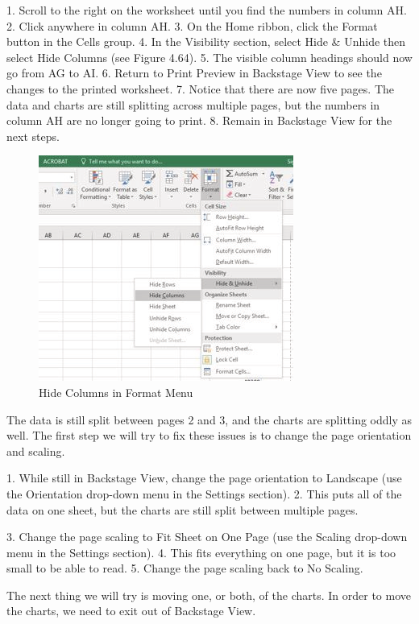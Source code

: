 1. Scroll to the right on the worksheet until you find the numbers in column AH.
2. Click anywhere in column AH.
3. On the Home ribbon, click the Format button in the Cells group.
4. In the Visibility section, select Hide \& Unhide then select Hide Columns (see Figure 4.64).
5. The visible column headings should now go from AG to AI.
6. Return to Print Preview in Backstage View to see the changes to the printed worksheet.
7. Notice that there are now five pages. The data and charts are still splitting across multiple
pages, but the numbers in column AH are no longer going to print.
8. Remain in Backstage View for the next steps.


\begin{figure}[H]
	\centering
	\includegraphics[width=\maxwidth{.95\linewidth}]{gfx/ch04_fig49}
	\caption{Hide Columns in Format Menu}
	\label{04:fig49}
\end{figure}

The data is still split between pages 2 and 3, and the charts are splitting oddly as well. The first step
we will try to fix these issues is to change the page orientation and scaling.

1. While still in Backstage View, change the page orientation to Landscape (use the Orientation
drop-down menu in the Settings section).
2. This puts all of the data on one sheet, but the charts are still split between multiple pages.


3. Change the page scaling to Fit Sheet on One Page (use the Scaling drop-down menu in the
Settings section).
4. This fits everything on one page, but it is too small to be able to read.
5. Change the page scaling back to No Scaling.

The next thing we will try is moving one, or both, of the charts. In order to move the charts, we need
to exit out of Backstage View.

